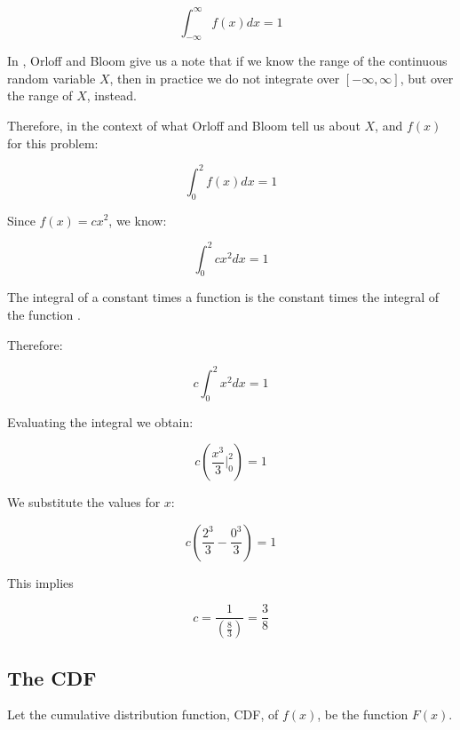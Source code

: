 \documentclass[a4paper,11pt]{article}
\begin{document}
\begin{equation}
  \int_{-\infty}^{\infty} f \left( x \right) dx = 1
\end{equation}

In \cite{reading5b}, Orloff and Bloom give us a note that if we know the range
of the continuous random variable $X$, then in practice we do not integrate
over $\left[ -\infty, \infty \right]$, but over the range of $X$, instead.

Therefore, in the context of what Orloff and Bloom tell us about $X$, and
$f \left(  x \right)$ for this problem:

\begin{equation}
  \int_{0}^{2} f \left( x \right) dx = 1
\end{equation}

Since $f \left( x \right) = cx^{2}$, we know:

\begin{equation}
  \int_{0}^{2}  cx^{2} dx = 1
\end{equation}

The integral of a constant times a function is the constant times the
integral of the function \cite{proofIntProps}.

Therefore:

\begin{equation}
  c \int_{0}^{2}  x^{2} dx = 1
\end{equation}

Evaluating the integral we obtain:

\begin{equation}
  c  \left( \frac{ x^{3}}{3}\bigg\rvert_{0}^{2} \right) = 1
\end{equation}

We substitute the values for $x$:

\begin{equation}
  c  \left( \frac{ 2^{3}}{3} - \frac{0^{3}}{3} \right) = 1
\end{equation}

This implies

\begin{equation}
  c  =  \frac{1}{\left( \frac{8}{3} \right)} = \frac{3}{8}
\end{equation}
\subsection{The CDF}

Let the cumulative distribution function, CDF, of $f\left( x \right)$, be
the function $F\left(x\right)$.
\end{document}

